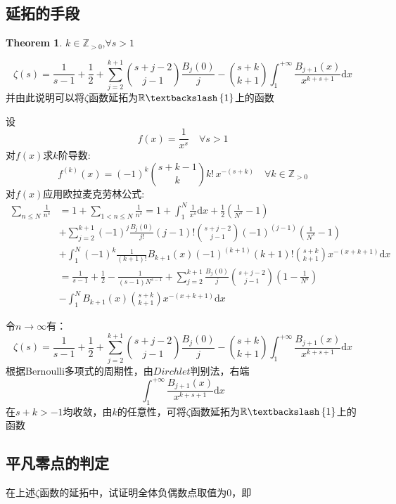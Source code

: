 \documentclass[a4paper,12pt]{ctexart}
\newenvironment{prooff}{{\noindent\it\textcolor{black}{Proof}:}\quad}{\par}
\theoremstyle{definition}
\newtheorem{theo}[defn]{Theorem}
\begin{document}
\subsection{延拓的手段}
\begin{theo}
    $k\in \mathbb{Z}_{>0}$,$\forall s>1$

    \begin{equation}
        \zeta(s)=\frac{1}{s-1}+\frac{1}{2}+\sum_{j=2}^{k+1}\binom{s+j-2}{j-1}\frac{B_j(0)}{j}-\binom{s+k}{k+1}\int_1^{+\infty}\frac{B_{j+1}(x)}{x^{k+s+1}}\text{d}x
    \end{equation}
    并由此说明可以将$\zeta$函数延拓为$\mathbb{R}\textbackslash\left\{1\right\}$上的函数
\end{theo}
\begin{prooff}
    设$$f(x)=\frac{1}{x^s}\quad \forall s>1$$
    对$f(x)$求$k$阶导数:
    \begin{equation*}
        f^{(k)}(x)=(-1)^k\binom{s+k-1}{k}k!\,x^{-(s+k)}\quad \forall k\in \mathbb{Z}_{>0}
    \end{equation*}
    对$f(x)$应用欧拉麦克劳林公式:
    \begin{align*}
        \sum_{n\le N}\frac{1}{n^s} & =1+\sum_{1<n\le N}\frac{1}{n^s}=1+\int_1^N \frac{1}{x^s}\text{d}x +\frac{1}{2}(\frac{1}{N^s}-1)                       \\
                                   & +\sum_{j=2}^{k+1}(-1)^j\frac{B_j(0)}{j!}(j-1)!\binom{s+j-2}{j-1}(-1)^{(j-1)}(\frac{1}{N^s}-1)                         \\
                                   & +\int_1^N (-1)^k\frac{1}{(k+1)!}B_{k+1}(x)(-1)^{(k+1)}(k+1)!\binom{s+k}{k+1}x^{-(x+k+1)}\text{d}x                     \\
                                   & =\frac{1}{s-1}+\frac{1}{2}-\frac{1}{(s-1)N^{s-1}}+\sum_{j=2}^{k+1}\frac{B_j(0)}{j}\binom{s+j-2}{j-1}(1-\frac{1}{N^s}) \\
                                   & -\int_1^N B_{k+1}(x)\binom{s+k}{k+1}x^{-(x+k+1)}\text{d}x
    \end{align*}

    令$n\to \infty $有：
    \begin{equation}
        \zeta(s)=\frac{1}{s-1}+\frac{1}{2}+\sum_{j=2}^{k+1}\binom{s+j-2}{j-1}\frac{B_j(0)}{j}-\binom{s+k}{k+1}\int_1^{+\infty}\frac{B_{j+1}(x)}{x^{k+s+1}}\text{d}x
    \end{equation}
    根据Bernoulli多项式的周期性，由$Dirchlet$判别法，右端$$\int_1^{+\infty}\frac{B_{j+1}(x)}{x^{k+s+1}}\text{d}x$$
    在$s+k>-1$均收敛，由$k$的任意性，可将$\zeta$函数延拓为$\mathbb{R}\textbackslash\left\{1\right\}$上的函数
    \subsection{平凡零点的判定}
    在上述$\zeta$函数的延拓中，试证明全体负偶数点取值为$0$，即
\end{prooff}
\end{document}
